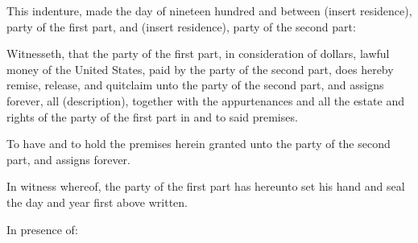 
This indenture, made the \blankunderline day of \blankunderline nineteen hundred
and \blankunderline between \blankunderline (insert residence), party of the
first part, and \blankunderline (insert residence), party of the second part: 

Witnesseth, that the party of the first part, in consideration of
\blankunderline
dollars, lawful money of the United States, paid by the party of the second
part, does hereby remise, release, and quitclaim unto the party of the second
part, \blankunderline and assigns forever, all (description), together with the
appurtenances and all the estate and rights of the party of the first part in
and to said premises. 

To have and to hold the premises herein granted unto the party of the second
part, \blankunderline and assigns forever. 

In witness whereof, the party of the first part has hereunto set his hand and
seal the day and year first above written. 

In presence of: 

